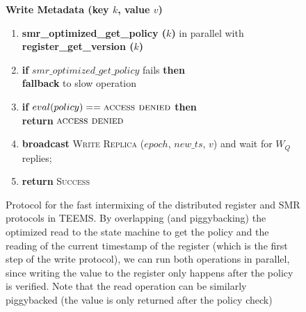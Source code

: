 \begin{figure}[t]
  \begin{small}
    \textbf{Write Metadata (key $k$, value $v$)}

    \begin{enumerate}[itemsep=0pt,parsep=0pt]

        \item \textbf{smr\_optimized\_get\_policy ($k$)} in
            parallel with \textbf{register\_get\_version ($k$)}

        \item \textbf{if} $smr\_optimized\_get\_policy$ fails \textbf{then}\\
            \tabto{.5cm}    \textbf{fallback} to slow operation

        \item \textbf{if} $eval(policy) == \textsc{access denied}$ \textbf{then}\\
            \tabto{.5cm}    \textbf{return} $\textsc{access denied}$

        \item \textbf{broadcast} \textsc{Write Replica} ($epoch$, $new\_ts$, $v$) and wait for $W_Q$ replies;

        \item \textbf{return} \textsc{Success}
    \end{enumerate}

  \end{small}
    \caption{Protocol for the fast intermixing of the distributed
    register and \ac{SMR} protocols in \ac{TEEMS}. By overlapping
    (and piggybacking) the optimized read to the state machine to
    get the policy and the reading of the current timestamp of
    the register (which is the first step of the write protocol),
    we can run both operations in parallel, since writing the
    value to the register only happens after the policy is
    verified. Note that the read operation can be similarly
    piggybacked (the value is only returned after the policy
    check)}\label{fig:teems_fast_mixing}
\end{figure}
